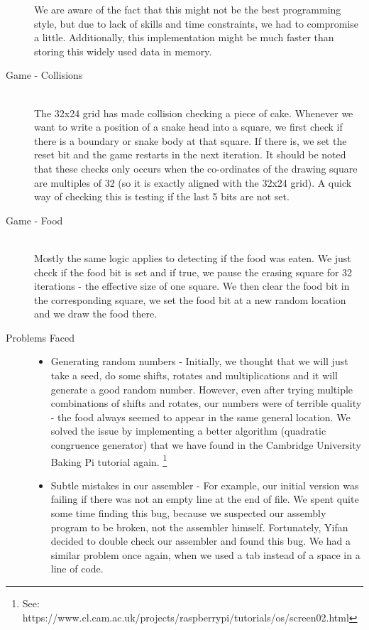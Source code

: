 \documentclass[9pt]{article}
\begin{document}
\begin{description}
    We are aware of the fact that this might not be the best programming style, but due to lack of skills and time constraints, we had to compromise a little. Additionally, this implementation might be much faster than storing this widely used data in memory.

        
    \item[Game - Collisions] \hfill \\
    The 32x24 grid has made collision checking a piece of cake. Whenever we want to write a position of a snake head into a square, we first check if there is a boundary or snake body at that square. If there is, we set the reset bit and the game restarts in the next iteration. It should be noted that these checks only occurs when the co-ordinates of the drawing square are multiples of 32 (so it is exactly aligned with the 32x24 grid). A quick way of checking this is testing if the last 5 bits are not set.
    
    \pagebreak
    \item[Game - Food] \hfill \\
    Mostly the same logic applies to detecting if  the food was eaten. We just check if the food bit is set and if true, we pause the erasing square for 32 iterations - the effective size of one square. We then clear the food bit in the corresponding square, we set the food bit at a new random location and we draw the food there.

    \item[Problems Faced] \hfill
    \begin{itemize}
    \item Generating random numbers - Initially, we thought that we will just take a seed, do some shifts, rotates and multiplications and it will generate a good random number. However, even after trying multiple combinations of shifts and rotates, our numbers were of terrible quality - the food always seemed to appear in the same general location. We solved the issue by implementing a better algorithm (quadratic congruence generator) that we have found in the Cambridge University Baking Pi tutorial again. \footnote{See: https://www.cl.cam.ac.uk/projects/raspberrypi/tutorials/os/screen02.html}
    
    \item Subtle mistakes in our assembler - For example, our initial version was failing if there was not an empty line at the end of file. We spent quite some time finding this bug, because we suspected our assembly program to be broken, not the assembler himself. Fortunately, Yifan decided to double check our assembler and found this bug. We had a similar problem once again, when we used a tab instead of a space in a line of code.
    

\end{itemize}
\end{description}
\end{document}
